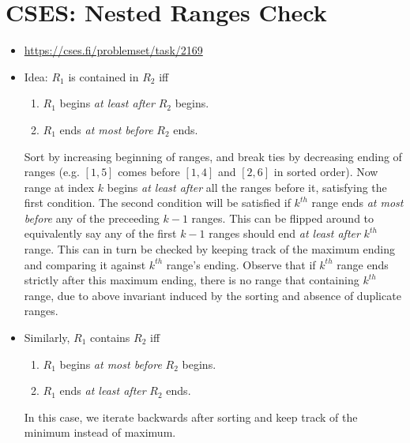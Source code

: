 \documentclass[titlepage, 12pt]{book}
\begin{document}
\section{CSES: Nested Ranges Check}
\begin{itemize}
    \item \url{https://cses.fi/problemset/task/2169}
    \item Idea: $R_1$ is contained in $R_2$ iff
        \begin{enumerate}
            \item $R_1$ begins \textit{at least after} $R_2$ begins.
            \item $R_1$ ends \textit{at most before} $R_2$ ends.
        \end{enumerate}
        Sort by increasing beginning of ranges, and break ties by decreasing
        ending of ranges (e.g. $[1, 5]$ comes before $[1, 4]$ and $[2, 6]$ in
        sorted order). Now range at index $k$ begins \textit{at least after} all
        the ranges before it, satisfying the first condition. The second
        condition will be satisfied if $k^{th}$ range ends \textit{at most
        before} any of the preceeding $k-1$ ranges. This can be flipped around
        to equivalently say any of the first $k - 1$ ranges should end
        \textit{at least after} $k^{th}$ range. This can in turn be checked by
        keeping track of the maximum ending and comparing it against $k^{th}$
        range's ending. Observe that if $k^{th}$ range ends strictly after this
        maximum ending, there is no range that containing $k^{th}$ range, due to
        above invariant induced by the sorting and absence of duplicate ranges.
    \item Similarly, $R_1$ contains $R_2$ iff
        \begin{enumerate}
            \item $R_1$ begins \textit{at most before} $R_2$ begins.
            \item $R_1$ ends \textit{at least after} $R_2$ ends.
        \end{enumerate}
        In this case, we iterate backwards after sorting and keep track of the
        minimum instead of maximum.
\end{itemize}
\end{document}
